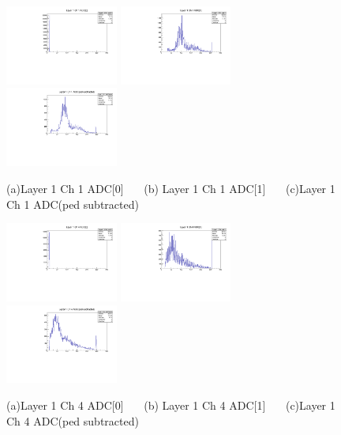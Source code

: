 \documentclass[a4paper,11pt]{article}
\theoremstyle{mytheor}
\begin{document}
\begin{figure}[H] 
\vspace*{-0.3cm} 
\includegraphics[width=0.33\textwidth,scale=0.5,trim=0 0 0 0,clip]{plotsdir/file0_muons-Layer1_Ch1_adc0-1.pdf} 
\includegraphics[width=0.33\textwidth,scale=0.5,trim=0 0 0 0,clip]{plotsdir/file0_muons-Layer1_Ch1_adc1-1.pdf} 
\includegraphics[width=0.33\textwidth,scale=0.5,trim=0 0 0 0,clip]{plotsdir/file0_muons-Layer1_Ch1_adcPedsub-1.pdf} 
\caption{(a)Layer 1 Ch 1 ADC[0] ~~~(b) Layer 1 Ch 1 ADC[1] ~~~(c)Layer 1 Ch 1 ADC(ped subtracted) } 
\end{figure} 
\begin{figure}[H] 
\vspace*{-0.3cm} 
\includegraphics[width=0.33\textwidth,scale=0.5,trim=0 0 0 0,clip]{plotsdir/file0_muons-Layer1_Ch4_adc0-1.pdf} 
\includegraphics[width=0.33\textwidth,scale=0.5,trim=0 0 0 0,clip]{plotsdir/file0_muons-Layer1_Ch4_adc1-1.pdf} 
\includegraphics[width=0.33\textwidth,scale=0.5,trim=0 0 0 0,clip]{plotsdir/file0_muons-Layer1_Ch4_adcPedsub-1.pdf} 
\caption{(a)Layer 1 Ch 4 ADC[0] ~~~(b) Layer 1 Ch 4 ADC[1] ~~~(c)Layer 1 Ch 4 ADC(ped subtracted) } 
\end{figure} 
\end{document}
